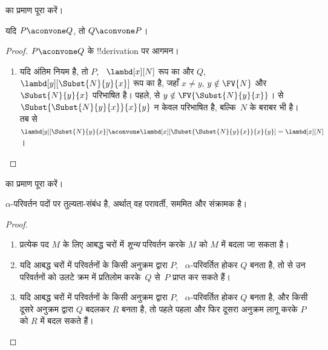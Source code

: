 \documentclass[../../../include/open-logic-section]{subfiles}
\begin{document}
\begin{prob}
   का प्रमाण पूरा करें।
\end{prob}

\begin{lem}
  यदि $P \aconvone Q$, तो $Q \aconvone P$।
\end{lem}

\begin{proof}
  $P \aconvone Q$ के !!{derivation} पर आगमन।
  \begin{enumerate}
  \item यदि अंतिम नियम  है, तो $P$,
    ~$\lambd[x][N]$ रूप का और $Q$, ~$\lambd[y][\Subst{N}{y}{x}]$ रूप का
    है, जहाँ $x \neq y$, $y \notin \FV{N}$ और $\Subst{N}{y}{x}$
    परिभाषित है। पहले,  से $y \notin
    \FV{\Subst{N}{y}{x}}$।  से
    $\Subst{\Subst{N}{y}{x}}{x}{y}$ न केवल परिभाषित है, बल्कि~$N$ के बराबर
    भी है। तब  से
    $\lambd[y][\Subst{N}{y}{x}] \aconvone
    \lambd[x][\Subst{\Subst{N}{y}{x}}{x}{y}] = \lambd[x][N]$।
  \end{enumerate}
\end{proof}

\begin{prob}
   का प्रमाण पूरा करें।
\end{prob}

\begin{thm}
  $\alpha$-परिवर्तन पदों पर तुल्यता-संबंध है, अर्थात् वह परावर्ती, सममित
  और संक्रामक है।
\end{thm}

\begin{proof}
  \begin{enumerate}
  \item प्रत्येक पद $M$ के लिए आबद्ध चरों में \emph{शून्य} परिवर्तन करके
    $M$ को $M$ में बदला जा सकता है।
  \item यदि आबद्ध चरों में परिवर्तनों के किसी अनुक्रम द्वारा $P$,
    ~$\alpha$-परिवर्तित होकर $Q$ बनता है, तो  से उन
    परिवर्तनों को उलटे क्रम में प्रतिलोम करके~$Q$ से~$P$ प्राप्त कर सकते
    हैं।
  \item यदि आबद्ध चरों में परिवर्तनों के किसी अनुक्रम द्वारा $P$,
    ~$\alpha$-परिवर्तित होकर $Q$ बनता है, और किसी दूसरे अनुक्रम द्वारा $Q$
    बदलकर $R$ बनता है, तो पहले पहला और फिर दूसरा अनुक्रम लागू करके $P$ को
    $R$ में बदल सकते हैं।
  \end{enumerate}
\end{proof}
\end{document}

